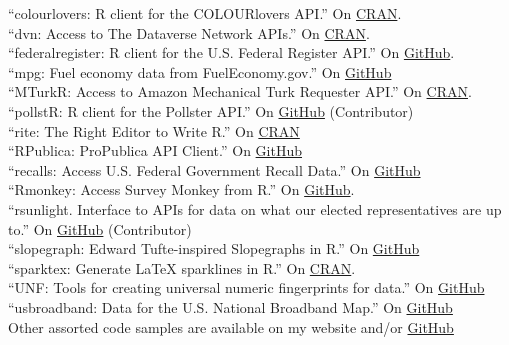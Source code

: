 \documentclass[12pt]{article}
\renewcommand{\section}[1]{\pagebreak[3]%
    \llap{\scshape\smash{\parbox[t]{\marginparwidth}{\raggedright {\color{lg}#1}}}}%
    \vspace{-\baselineskip}\par}
\newcommand{\entry}[1]{\indent {\color{lg}\guillemotright}\hspace{2pt}#1\vspace{.25em}\\}
\begin{document}
\section{Software}
\entry{``colourlovers: R client for the COLOURlovers API.'' On \href{http://cran.r-project.org/web/packages/colourlovers/index.html}{CRAN}.}
\entry{``dvn: Access to The Dataverse Network APIs.'' On \href{http://cran.r-project.org/web/packages/dvn/index.html}{CRAN}.}
\entry{``federalregister: R client for the U.S. Federal Register API.'' On \href{https://github.com/rOpenGov/federalregister}{GitHub}.}
\entry{``mpg: Fuel economy data from FuelEconomy.gov.'' On \href{https://github.com/rOpenGov/mpg}{GitHub}}
\entry{``MTurkR: Access to Amazon Mechanical Turk Requester API.'' On \href{http://cran.r-project.org/web/packages/MTurkR/index.html}{CRAN}.}
\entry{``pollstR: R client for the Pollster API.'' On \href{https://github.com/rOpenGov/pollstR}{GitHub} (Contributor)}
\entry{``rite: The Right Editor to Write R.'' On \href{http://cran.r-project.org/web/packages/rite/index.html}{CRAN}}
\entry{``RPublica: ProPublica API Client.'' On \href{https://github.com/rOpenGov/RPublica}{GitHub}}
\entry{``recalls: Access U.S. Federal Government Recall Data.'' On \href{https://github.com/rOpenGov/recalls}{GitHub}}
\entry{``Rmonkey: Access Survey Monkey from R.'' On \href{https://github.com/leeper/Rmonkey}{GitHub}.}
\entry{``rsunlight. Interface to APIs for data on what our elected representatives are up to.'' On \href{https://github.com/rOpenGov/rsunlight}{GitHub} (Contributor)}
\entry{``slopegraph: Edward Tufte-inspired Slopegraphs in R.'' On \href{https://github.com/leeper/slopegraph}{GitHub}}
\entry{``sparktex: Generate LaTeX sparklines in R.'' On \href{http://cran.r-project.org/web/packages/sparktex/index.html}{CRAN}.}
\entry{``UNF: Tools for creating universal numeric fingerprints for data.'' On \href{https://github.com/leeper/UNF}{GitHub}}
\entry{``usbroadband: Data for the U.S. National Broadband Map.'' On \href{https://github.com/rOpenGov/usbroadband}{GitHub}}
\entry{Other assorted code samples are available on my website and/or \href{http://github.com/leeper}{GitHub}}
\end{document}
